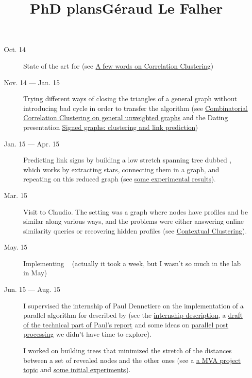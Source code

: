 \documentclass[a4paper,11pt,oneside,onecolumn,openany,final,svgnames]{memoir}
\title{PhD plans}
\title{Géraud Le Falher}
\begin{document}
\maketitle
\begin{description}
	\item[Oct. 14] State of the art for \pcc{} (see
		\href{run:support/cc.pdf}{A few words on Correlation Clustering})
	\item[Nov. 14 --- Jan. 15] Trying different ways of closing the
		triangles of a general graph without introducing bad cycle in
		order to transfer the \ccPivot{} algorithm (see
		\href{run:support/december.pdf}{Combinatorial
		Correlation Clustering on general unweighted graphs} and the Dating presentation
		\href{run:support/presentationeng.pdf}{Signed graphs: clustering and link prediction})
	\item[Jan. 15 --- Apr. 15]{Predicting link signs by building a low
		stretch spanning tree dubbed \gtx{}, which works by extracting
		stars, connecting them in a graph, and repeating on this reduced graph
		(see \href{run:support/nips2015.pdf}{some experimental results}).}
	\item[Mar. 15] Visit to Claudio. The setting was a graph where nodes have profiles and be
		similar along various ways, and the problems were either answering online
		similarity queries or recovering hidden profiles (see
		\href{run:support/contextual_clustering.pdf}{Contextual Clustering}).
	\item[May. 15] Implementing \shz{}~\autocite{Vitale2012} (actually it took a week, but I wasn't so
		much in the lab in May)
	\item[Jun. 15 --- Aug. 15] 
		I supervised the internship of Paul Dennetiere on the implementation of a parallel
		algorithm for \pcc{} described by \textcite{Pan2014} (see the
		\href{run:support/stage_cc.pdf}{internship description}, a
		\href{run:support/draft_paul.pdf}{draft of the technical part of Paul's report} and
		some ideas on \href{run:support/parallel_postprocessing.pdf}{parallel post
		processing} we didn't have time to explore).

		I worked on building trees that minimized the stretch of the distances between a
		set of revealed nodes and the other ones (see a
		\href{run:support/sujet2_lowstretch.pdf}{a MVA project topic} and
		\href{run:support/constrained_low_stretch.pdf}{some initial experiments}).


\end{description}
\end{document}
